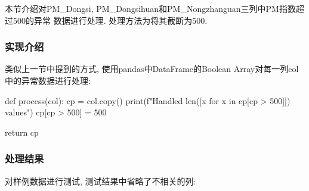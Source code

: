 本节介绍对PM\_Dongsi, PM\_Dongsihuan和PM\_Nongzhanguan三列中PM指数超过500的异常
数据进行处理. 处理方法为将其截断为500.\par

\subsubsection{实现介绍}
类似上一节中提到的方式, 使用pandas中DataFrame的Boolean Array对每一列col中的异常数据进行处理:
\begin{python}
    def process(col):
        cp = col.copy()
        print(f"Handled {len([x for x in cp[cp > 500]])} values")
        cp[cp > 500] = 500

        return cp
\end{python}

\subsubsection{处理结果}
对样例数据进行测试, 测试结果中省略了不相关的列:
